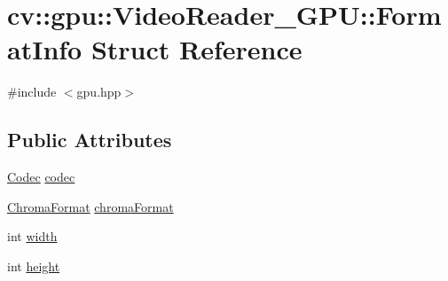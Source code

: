\hypertarget{structcv_1_1gpu_1_1VideoReader__GPU_1_1FormatInfo}{\section{cv\-:\-:gpu\-:\-:Video\-Reader\-\_\-\-G\-P\-U\-:\-:Format\-Info Struct Reference}
\label{structcv_1_1gpu_1_1VideoReader__GPU_1_1FormatInfo}
}


{\ttfamily \#include $<$gpu.\-hpp$>$}

\subsection*{Public Attributes}
\begin{DoxyCompactItemize}
\item 
\hyperlink{classcv_1_1gpu_1_1VideoReader__GPU_afdb33778111ce0c50a8de381ad562b16}{Codec} \hyperlink{structcv_1_1gpu_1_1VideoReader__GPU_1_1FormatInfo_aa5adba8a81873df9339c844822887ad3}{codec}
\item 
\hyperlink{classcv_1_1gpu_1_1VideoReader__GPU_a7fc7968ff0961cdaa050b3845799b440}{Chroma\-Format} \hyperlink{structcv_1_1gpu_1_1VideoReader__GPU_1_1FormatInfo_a9400bdc8903cc435acbf37036a06225e}{chroma\-Format}
\item 
int \hyperlink{structcv_1_1gpu_1_1VideoReader__GPU_1_1FormatInfo_adc76516e2ddf81180fe8eb29719223c1}{width}
\item 
int \hyperlink{structcv_1_1gpu_1_1VideoReader__GPU_1_1FormatInfo_a3922e3c3cb30e9dcb465db81176364ef}{height}
\end{DoxyCompactItemize}


